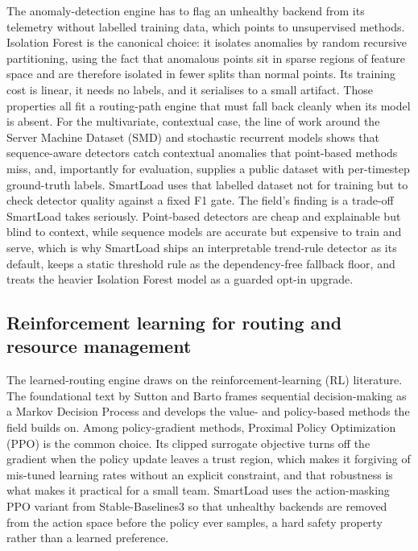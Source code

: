 The anomaly-detection engine has to flag an unhealthy backend from its telemetry
without labelled training data, which points to unsupervised methods. Isolation
Forest \cite{liu2008isolationforest} is the canonical choice: it isolates
anomalies by random recursive partitioning, using the fact that anomalous
points sit in sparse regions of feature space and are therefore isolated in
fewer splits than normal points. Its training cost is linear, it needs no
labels, and it serialises to a small artifact. Those properties all fit a
routing-path engine that must fall back cleanly when its model is absent. For
the multivariate, contextual case, the line of work around the Server Machine
Dataset (SMD) and stochastic recurrent models \cite{su2019omnianomaly} shows
that sequence-aware detectors catch contextual anomalies that point-based
methods miss, and, importantly for evaluation, supplies a public dataset with
per-timestep ground-truth labels. SmartLoad uses that labelled dataset not for
training but to check detector quality against a fixed F1 gate. The field's
finding is a trade-off SmartLoad takes seriously. Point-based detectors are
cheap and explainable but blind to context, while sequence models are accurate
but expensive to train and serve, which is why SmartLoad ships an interpretable
trend-rule detector as its default, keeps a static threshold rule as the
dependency-free fallback floor, and treats the heavier Isolation Forest model as
a guarded opt-in upgrade.

\subsection{Reinforcement learning for routing and resource management}
\label{lit:sec:research-rl}

The learned-routing engine draws on the reinforcement-learning (RL) literature.
The foundational text by Sutton and Barto \cite{sutton2018rl} frames sequential
decision-making as a Markov Decision Process and develops the value- and
policy-based methods the field builds on. Among policy-gradient methods,
Proximal Policy Optimization (PPO) \cite{schulman2017ppo} is the common choice.
Its clipped surrogate objective turns off the gradient when the policy update
leaves a trust region, which makes it forgiving of mis-tuned learning rates
without an explicit constraint, and that robustness is what makes it practical
for a small team. SmartLoad uses the action-masking PPO variant from
Stable-Baselines3 \cite{raffin2021sb3} so that unhealthy backends are removed
from the action space before the policy ever samples, a hard safety property
rather than a learned preference.

